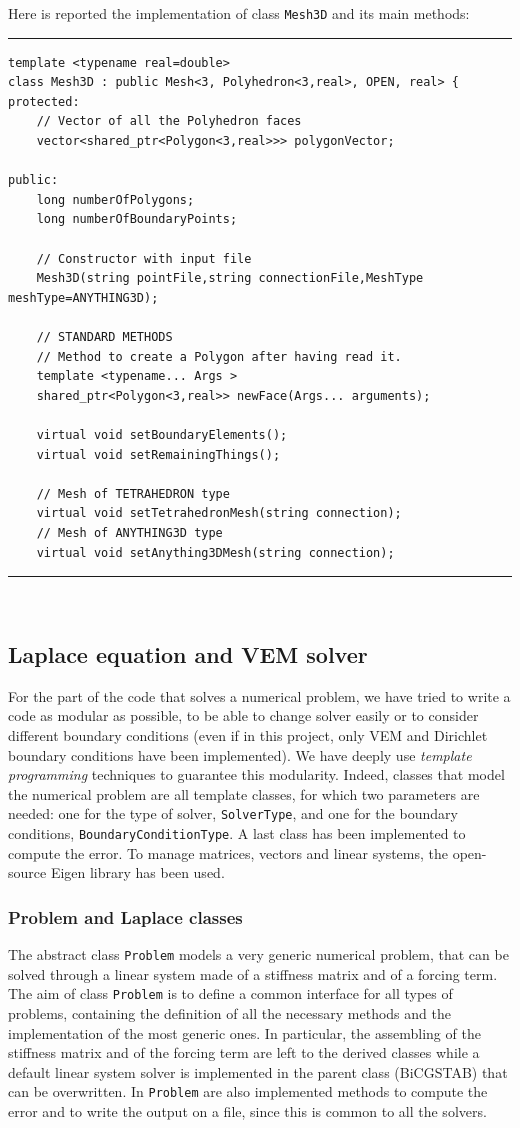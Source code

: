 Here is reported the implementation of class \verb|Mesh3D| and its main methods:

\noindent\rule{16cm}{1pt}
\begin{lstlisting}[caption=File \texttt{Mesh3D.h}]
template <typename real=double>
class Mesh3D : public Mesh<3, Polyhedron<3,real>, OPEN, real> {
protected:
    // Vector of all the Polyhedron faces
    vector<shared_ptr<Polygon<3,real>>> polygonVector;  

public:
    long numberOfPolygons;
    long numberOfBoundaryPoints;

    // Constructor with input file
    Mesh3D(string pointFile,string connectionFile,MeshType 
meshType=ANYTHING3D);
	
    // STANDARD METHODS
    // Method to create a Polygon after having read it.
    template <typename... Args >
    shared_ptr<Polygon<3,real>> newFace(Args... arguments);

    virtual void setBoundaryElements();
    virtual void setRemainingThings();

    // Mesh of TETRAHEDRON type
    virtual void setTetrahedronMesh(string connection);
    // Mesh of ANYTHING3D type
    virtual void setAnything3DMesh(string connection);
\end{lstlisting}
\noindent\rule{16cm}{1pt}\\

\subsection{Laplace equation and VEM solver}
For the part of the code that solves a numerical problem, we have tried to write a code as modular as possible, to be able to change solver easily or to consider different boundary conditions (even if in this project, only VEM and Dirichlet boundary conditions have been implemented). We have deeply use \textit{template programming} techniques to guarantee this modularity. Indeed, classes that model the numerical problem are all template classes, for which two parameters are needed: one for the type of solver, \verb|SolverType|, and one for the boundary conditions, \verb|BoundaryConditionType|. A last class has been implemented to compute the error. To manage matrices, vectors and linear systems, the open-source Eigen library has been used. 

\subsubsection{Problem and Laplace classes}
The abstract class \verb|Problem| models a very generic numerical problem, that can be solved through a linear system made of a stiffness matrix and of a forcing term. The aim of class \verb|Problem| is to define a common interface for all types of problems, containing the definition of all the necessary methods and the implementation of the most generic ones. In particular, the assembling of the stiffness matrix and of the forcing term are left to the derived classes while a default linear system solver is implemented in the parent class (BiCGSTAB) that can be overwritten. In \verb|Problem| are also implemented methods to compute the error and to write the output on a file, since this is common to all the solvers. 

